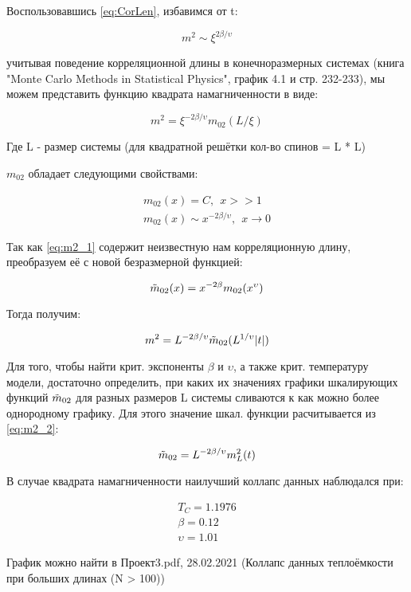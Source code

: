 Воспользовавшись \eqref{eq:CorLen}, избавимся от t:

\begin{equation}
    m^{2} \sim \xi ^{2\beta/\upsilon}
\end{equation}

учитывая поведение корреляционной длины в конечноразмерных системах (книга "Monte Carlo Methods in Statistical Physics", график 4.1 и стр. 232-233)\cite{NewBar}, мы можем представить функцию квадрата намагниченности в виде:

\begin{equation}\label{eq:m2_1}
    m^{2} = \xi ^{-2\beta/\upsilon} m_{02}(L/\xi)
\end{equation}

Где L - размер системы (для квадратной решётки кол-во спинов = L * L)

$m_{02}$ обладает следующими свойствами:

\begin{align*}
    m_{02}(x) = C,\ \ x >> 1 \\
    m_{02}(x) \sim x^{-2\beta/\upsilon},\ \ x \rightarrow 0
\end{align*}

Так как \eqref{eq:m2_1} содержит неизвестную нам корреляционную длину, преобразуем её с новой безразмерной функцией:

\begin{equation}
    \Tilde{m}_{02}(x) = x^{-2\beta} m_{02}(x^{\upsilon})
\end{equation}

Тогда получим:

\begin{equation}\label{eq:m2_2}
    m^{2} = L^{-2\beta/\upsilon} \Tilde{m}_{02}(L^{1/\upsilon}|t|)
\end{equation}

Для того, чтобы найти крит. экспоненты $\beta$ и $\upsilon$, а также крит. температуру модели, достаточно определить, при каких их значениях графики шкалирующих функций $\Tilde{m}_{02}$ для разных размеров L системы сливаются к как можно более однородному графику. Для этого значение шкал. функции расчитывается из \eqref{eq:m2_2}:

\begin{equation}\label{eq:m02}
    \Tilde{m}_{02} = L^{-2\beta/\upsilon} m_{L}^{2}(t)
\end{equation}

В случае квадрата намагниченности наилучший коллапс данных наблюдался при:

\begin{align*}
    T_{C} = 1.1976 \\
    \beta = 0.12 \\
    \upsilon = 1.01
\end{align*}

График можно найти в Проект3.pdf, 28.02.2021 (Коллапс данных теплоёмкости при больших длинах (N > 100)) \cite{Git}